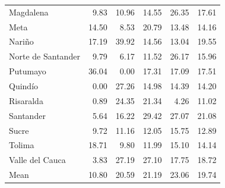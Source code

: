 \documentclass[11pt,a4paper,oneside]{article}
\begin{document}
\begin{table}[htbp]
\begin{tabular}{lrrrrr}
    Magdalena & 9.83 & 10.96 & 14.55 & 26.35 & 17.61 \\
    Meta  & 14.50 & 8.53 & 20.79 & 13.48 & 14.16 \\
    Nari\~no & 17.19 & 39.92 & 14.56 & 13.04 & 19.55 \\
    Norte de Santander & 9.79 & 6.17 & 11.52 & 26.17 & 15.96 \\
    Putumayo & 36.04 & 0.00 & 17.31 & 17.09 & 17.51 \\
    Quind\'io & 0.00 & 27.26 & 14.98 & 14.39 & 14.20 \\
    Risaralda & 0.89 & 24.35 & 21.34 & 4.26 & 11.02 \\
    Santander & 5.64 & 16.22 & 29.42 & 27.07 & 21.08 \\
    Sucre & 9.72 & 11.16 & 12.05 & 15.75 & 12.89 \\
    Tolima & 18.71 & 9.80 & 11.99 & 15.10 & 14.14 \\
    Valle del Cauca & 3.83 & 27.19 & 27.10 & 17.75 & 18.72 \\
    \midrule
    Mean  & 10.80 & 20.59 & 21.19 & 23.06 & 19.74 \\
    \bottomrule
    \end{tabular}
  \label{tab:inputs_savings_dpt}
\end{table}

\vspace*{\fill}


\color{blue}
\end{document}
